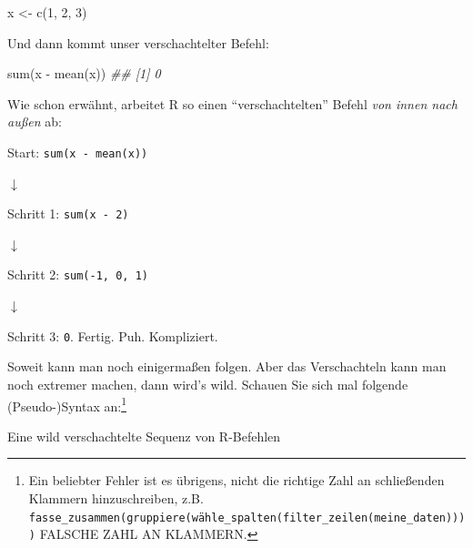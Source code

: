\documentclass[
  a4paper,
  DIV=11]{scrreprt}
\newenvironment{Shaded}{\begin{snugshade}}{\end{snugshade}}
\newcommand{\DecValTok}[1]{\textcolor[rgb]{0.68,0.00,0.00}{#1}}
\newcommand{\DocumentationTok}[1]{\textcolor[rgb]{0.37,0.37,0.37}{\textit{#1}}}
\newcommand{\FunctionTok}[1]{\textcolor[rgb]{0.28,0.35,0.67}{#1}}
\newcommand{\NormalTok}[1]{\textcolor[rgb]{0.00,0.23,0.31}{#1}}
\newcommand{\OtherTok}[1]{\textcolor[rgb]{0.00,0.23,0.31}{#1}}
\newcommand{\SpecialCharTok}[1]{\textcolor[rgb]{0.37,0.37,0.37}{#1}}
\theoremstyle{definition}
\theoremstyle{definition}
\theoremstyle{definition}
\theoremstyle{remark}
\begin{document}
\begin{Shaded}
\begin{Highlighting}[]
\NormalTok{x }\OtherTok{\textless{}{-}} \FunctionTok{c}\NormalTok{(}\DecValTok{1}\NormalTok{, }\DecValTok{2}\NormalTok{, }\DecValTok{3}\NormalTok{)}
\end{Highlighting}
\end{Shaded}

Und dann kommt unser verschachtelter Befehl:

\begin{Shaded}
\begin{Highlighting}[]
\FunctionTok{sum}\NormalTok{(x }\SpecialCharTok{{-}} \FunctionTok{mean}\NormalTok{(x))}
\DocumentationTok{\#\# [1] 0}
\end{Highlighting}
\end{Shaded}

Wie schon erwähnt, arbeitet R so einen ``verschachtelten'' Befehl
\emph{von innen nach außen} ab:

Start: \texttt{sum(x\ -\ mean(x))}

{\(\downarrow\)}

Schritt 1: \texttt{sum(x\ -\ 2)}

{\(\downarrow\)}

Schritt 2: \texttt{sum(-1,\ 0,\ 1)}

{\(\downarrow\)}

Schritt 3: \texttt{0}. Fertig. Puh. Kompliziert.

Soweit kann man noch einigermaßen folgen. Aber das Verschachteln kann
man noch extremer machen, dann wird's wild. Schauen Sie sich mal
folgende (Pseudo-)Syntax an:\footnote{Ein beliebter Fehler ist es
  übrigens, nicht die richtige Zahl an schließenden Klammern
  hinzuschreiben, z.B.
  \texttt{fasse\_zusammen(gruppiere(wähle\_spalten(filter\_zeilen(meine\_daten))))}
  FALSCHE ZAHL AN KLAMMERN.}

\begin{codelisting}

\caption{\label{lst-schachtel}Eine wild verschachtelte Sequenz von
R-Befehlen}

\centering{

\begin{Shaded}
\begin{Highlighting}[]
\FunctionTok{fasse\_zusammen}\NormalTok{(}
  \FunctionTok{gruppiere}\NormalTok{(}
\NormalTok{    wähle}\FunctionTok{\_spalten}\NormalTok{(}
      \FunctionTok{filter\_zeilen}\NormalTok{(meine\_daten))))}
\end{Highlighting}
\end{Shaded}

}

\end{codelisting}%
\end{document}
